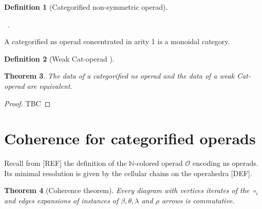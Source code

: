 \documentclass[10pt]{amsart}
\newtheorem{thm}{Theorem}[section]
\theoremstyle{definition}
\newtheorem{definition}[thm]{Definition}
\theoremstyle{remark}
\numberwithin{equation}{section}
\newcommand{\0}{\color{blue}{\mathsf{0}}}
\begin{document}
\begin{definition}[Categorified non-symmetric operad]
\begin{center}
{  } \quad \ .
\end{center}
\end{definition}

A categorified ns operad concentrated in arity 1 is a monoidal category.

\begin{definition}[Weak Cat-operad {\cite{DP15}}]
\end{definition}

\begin{thm} \label{thm:equivalenceDPGLA}
    The data of a categorified ns operad and the data of a weak Cat-operad are equivalent.  
\end{thm}

\begin{proof}
    TBC
\end{proof}

\section{Coherence for categorified operads}

Recall from [REF] the definition of the $\mathbb{N}$-colored operad $\mathcal{O}$ encoding ns operads. Its minimal resolution is given by the cellular chains on the operahedra [DEF]. 



\begin{thm}[Coherence theorem] \label{thm:coherence}
    Every diagram with vertices iterates of the $\circ_i$ and edges expansions of instances of $\beta, \theta, \lambda$ and $\rho$ arrows is commutative. 
\end{thm}
\end{document}
